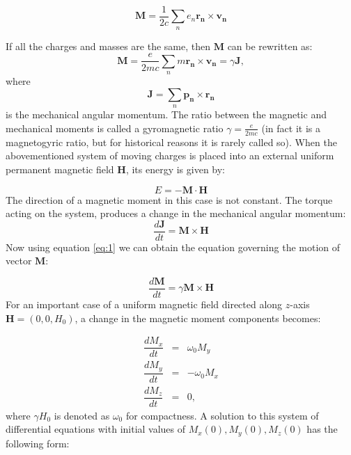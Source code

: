 \documentclass[a4paper, 12pt]{article}
\begin{document}
\begin{equation}
\bm{M} = \frac{1}{2c} \sum_{n} e_n\bm{r_n} \times \bm{v_n}
\end{equation}

If all the charges and masses are the same, then $\bm{M}$ can be rewritten as:
\begin{equation} \label{eq:1}
\bm{M} = \frac{e}{2mc} \sum_{n} m\bm{r_n} \times \bm{v_n} = \gamma \bm{J},
\end{equation}
where
\begin{equation}
\bm{J} = \sum_{n} \bm{p_n} \times \bm{r_n}
\end{equation}
is the mechanical angular momentum. The ratio between the magnetic and mechanical moments is called a gyromagnetic ratio $\gamma = \frac{e}{2mc}$ (in fact it is a magnetogyric ratio, but for historical reasons it is rarely called so).
When the abovementioned system of moving charges is placed into an external uniform permanent magnetic field $\bm{H}$, its energy is given by:

\begin{equation} \label{eq:2}
E = -\bm{M} \cdot \bm{H}
\end{equation}
The direction of a magnetic moment in this case is not constant. The torque acting on the system, produces a change in the mechanical angular momentum:
\begin{equation}
\frac{d\bm{J}}{dt} = \bm{M} \times \bm{H}
\end{equation}
Now using equation \ref{eq:1} we can obtain the equation governing the motion of vector $\bm{M}$:

\begin{equation} \label{eq:precession_compact}
\frac{d\bm{M}}{dt} = \gamma \bm{M} \times \bm{H}
\end{equation}
For an important case of a uniform magnetic field directed along $z$-axis $\bm{H} = (0, 0, H_0)$, a change in the magnetic moment components becomes:

\begin{equation} \label{precession}
\begin{array}{lcl}
\dfrac{dM_x}{dt} & = & \omega_0 M_y \\
\dfrac{dM_y}{dt} & = & -\omega_0 M_x \\
\dfrac{dM_z}{dt} & = & 0,
\end{array}
\end{equation}
where $\gamma H_0$ is denoted as $\omega_0$ for compactness.
A solution to this system of differential equations with initial values of $M_x(0), M_y(0), M_z(0)$ has the following form:
\end{document}
